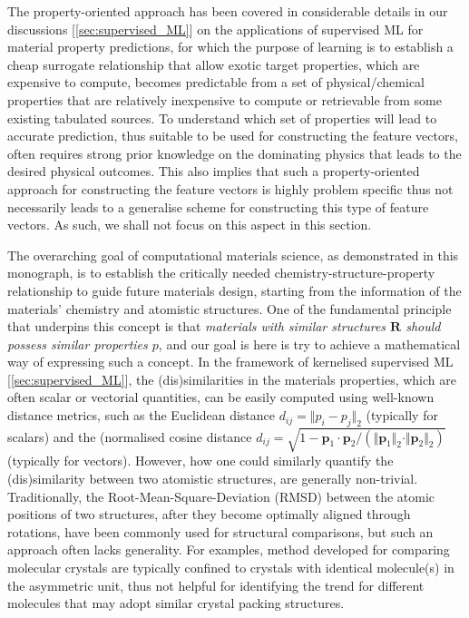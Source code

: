 The property-oriented approach has been covered in considerable details in our discussions [\cref{sec:supervised_ML}] on the applications of supervised ML for material property predictions, for which the purpose of learning is to establish a cheap surrogate relationship that allow exotic target properties, which are expensive to compute, becomes predictable from a set of physical/chemical properties that are relatively inexpensive to compute or retrievable from some existing tabulated sources. To understand which set of properties will lead to accurate prediction, thus suitable to be used for constructing the feature vectors, often requires strong prior knowledge on the dominating physics that leads to the desired physical outcomes. This also implies that such a property-oriented approach for constructing the feature vectors is highly problem specific thus not necessarily leads to a generalise scheme for constructing this type of feature vectors. As such, we shall not focus on this aspect in this section.


The overarching goal of computational materials science, as demonstrated in this monograph, is to establish the critically needed chemistry-structure-property relationship to guide future materials design, starting from the information of the materials' chemistry and atomistic structures. One of the fundamental principle that underpins this concept is that \emph{ materials with similar structures $\mathbf{R}$ should possess similar properties $p$}, and our goal is here is try to achieve a mathematical way of expressing such a concept. In the framework of kernelised supervised ML [\cref{sec:supervised_ML}], the (dis)similarities in the materials properties, which are often scalar or vectorial quantities, can be easily computed using well-known distance metrics, such as the Euclidean distance $d_{ij}=\Vert p_{i}-p_{j}\Vert_2$ (typically for scalars) and the (normalised cosine distance $d_{ij}=\sqrt{1-\bm{p}_1\cdot \bm{p}_2/(\Vert \bm{p}_1\Vert_2\cdot\Vert \bm{p}_{2}\Vert_2)}$ (typically for vectors). However, how one could similarly quantify the (dis)similarity between two atomistic structures, are generally non-trivial. Traditionally, the Root-Mean-Square-Deviation (RMSD) between the atomic positions of two structures, after they become optimally aligned through rotations,\cite{coutsias2004using,chisholm2005compack} have been commonly used for structural comparisons, but such an approach often lacks generality. For examples, method developed for comparing molecular crystals\cite{chisholm2005compack} are typically confined to crystals with identical molecule(s) in the asymmetric unit, thus not helpful for identifying the trend for different molecules that may adopt similar crystal packing structures.\cite{yang2018large}

